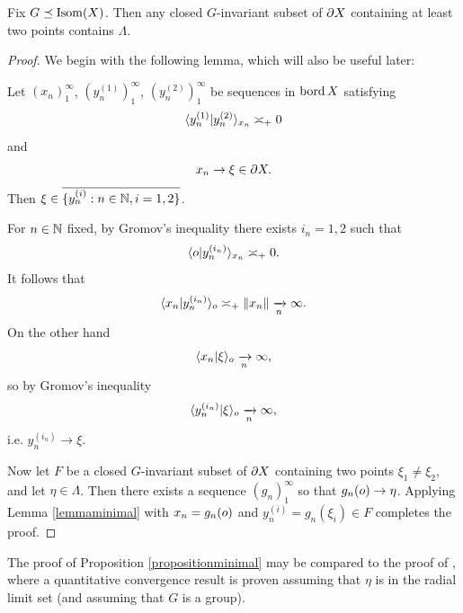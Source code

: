 \begin{proposition}
\label{propositionminimal}
Fix $G\preceq\operatorname{Isom}(X)$. Then any closed $G$-invariant subset of $\partial X$ containing at least two points contains $\Lambda$.
\end{proposition}
\begin{proof}
We begin with the following lemma, which will also be useful later:
\begin{lemma}
\label{lemmaminimal}
Let $(x_n)_1^\infty$, $(y_n^{(1)})_1^\infty$, $(y_n^{(2)})_1^\infty$ be sequences in $\operatorname{bord} X$ satisfying
\[
\langle y_n^{(1)} | y_n^{(2)} \rangle_{x_n} \asymp_+ 0
\]
and
\[
x_n \to \xi\in\partial X.
\]
Then $\xi\in\cl{\{y_n^{(i)} : n\in\N , i = 1,2\}}$.
\end{lemma}
\begin{subproof}
For $n\in\N$ fixed, by Gromov's inequality there exists $i_n = 1,2$ such that
\[
\langle o | y_n^{(i_n)} \rangle_{x_n} \asymp_+ 0.
\]
It follows that
\[
\langle x_n | y_n^{(i_n)}\rangle_o \asymp_+ \|x_n\| \xrightarrow[n]{} \infty.
\]
On the other hand
\[
\langle x_n | \xi\rangle_o \xrightarrow[n]{} \infty,
\]
so by Gromov's inequality
\[
\langle y_n^{(i_n)} | \xi \rangle_o \xrightarrow[n]{} \infty,
\]
i.e. $y_n^{(i_n)} \to \xi$.
\end{subproof}
Now let $F$ be a closed $G$-invariant subset of $\partial X$ containing two points $\xi_1\neq\xi_2$, and let $\eta\in\Lambda$. Then there exists a sequence $(g_n)_1^\infty$ so that $g_n(o)\to\eta$. Applying Lemma \ref{lemmaminimal} with $x_n = g_n(o)$ and $y_n^{(i)} = g_n(\xi_i)\in F$ completes the proof.

\end{proof}
The proof of Proposition \ref{propositionminimal} may be compared to the proof of \cite[Theorem 3.1]{FSU4}, where a quantitative convergence result is proven assuming that $\eta$ is in the radial limit set (and assuming that $G$ is a group).

